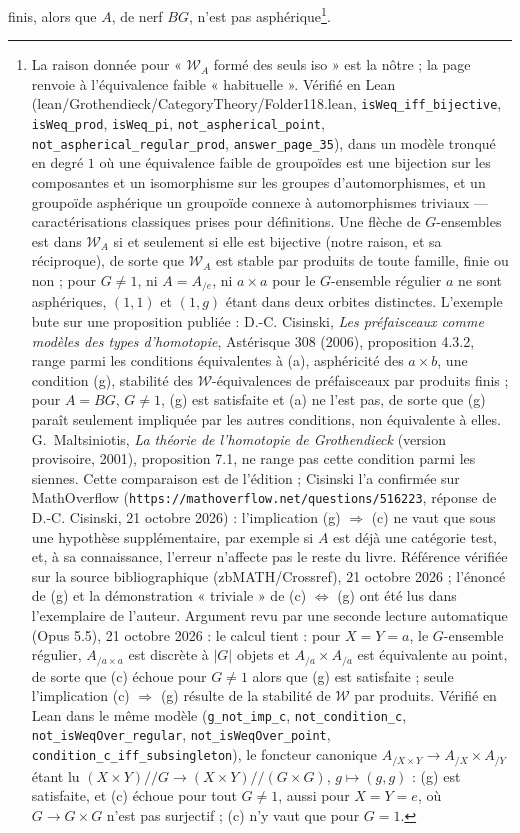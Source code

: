\documentclass[11pt,a4paper]{article}
\begin{document}
finis, alors que $A$, de nerf $BG$, n'est pas asphérique\footnote{La raison
donnée pour « $\mathcal{W}_{A}$ formé des seuls iso » est la nôtre ; la page
renvoie à l'équivalence faible « habituelle ». Vérifié en Lean
(lean/Grothendieck/CategoryTheory/Folder118.lean, \texttt{isWeq\_iff\_bijective},
\texttt{isWeq\_prod}, \texttt{isWeq\_pi}, \texttt{not\_aspherical\_point},
\texttt{not\_aspherical\_regular\_prod}, \texttt{answer\_page\_35}), dans un
modèle tronqué en degré $1$ où une équivalence faible de groupoïdes est une
bijection sur les composantes et un isomorphisme sur les groupes
d'automorphismes, et un groupoïde asphérique un groupoïde connexe à
automorphismes triviaux --- caractérisations classiques prises pour
définitions. Une flèche de $G$-ensembles est dans $\mathcal{W}_{A}$ si et
seulement si elle est bijective (notre raison, et sa réciproque), de sorte que
$\mathcal{W}_{A}$ est stable par produits de toute famille, finie ou non ; pour
$G \neq 1$, ni $A = A_{/e}$, ni $a \times a$ pour le $G$-ensemble régulier $a$
ne sont asphériques, $(1, 1)$ et $(1, g)$ étant dans deux orbites distinctes.
L'exemple bute sur une proposition publiée : D.-C. Cisinski, \emph{Les
préfaisceaux comme modèles des types d'homotopie}, Astérisque 308 (2006),
proposition 4.3.2, range parmi les conditions équivalentes à (a), asphéricité
des $a \times b$, une condition (g), stabilité des $\mathcal{W}$-équivalences
de préfaisceaux par produits finis ; pour $A = BG$, $G \neq 1$, (g) est
satisfaite et (a) ne l'est pas, de sorte que (g) paraît seulement
impliquée par les autres conditions, non équivalente à elles. G.~Maltsiniotis, \emph{La théorie de l'homotopie de
Grothendieck} (version provisoire, 2001), proposition 7.1, ne range pas cette
condition parmi les siennes. Cette comparaison est de l'édition ; Cisinski l'a confirmée sur MathOverflow (\texttt{https://mathoverflow.net/questions/516223}, réponse de D.-C. Cisinski, 21 octobre 2026) : l'implication (g) $\Rightarrow$ (c) ne vaut que sous une hypothèse supplémentaire, par exemple si $A$ est déjà une catégorie test, et, à sa connaissance, l'erreur n'affecte pas le reste du livre. Référence vérifiée sur la source bibliographique (zbMATH/Crossref), 21 octobre 2026 ; l'énoncé de (g) et la démonstration « triviale » de (c) $\Leftrightarrow$ (g) ont été lus dans l'exemplaire de l'auteur. Argument revu par une seconde lecture automatique (Opus 5.5), 21 octobre 2026 : le calcul tient : pour $X = Y = a$, le $G$-ensemble régulier, $A_{/a \times a}$ est discrète à $|G|$ objets et $A_{/a} \times A_{/a}$ est équivalente au point, de sorte que (c) échoue pour $G \neq 1$ alors que (g) est satisfaite ; seule l'implication (c) $\Rightarrow$ (g) résulte de la stabilité de $\mathcal{W}$ par produits. Vérifié en Lean dans le même modèle (\texttt{g\_not\_imp\_c}, \texttt{not\_condition\_c}, \texttt{not\_isWeqOver\_regular}, \texttt{not\_isWeqOver\_point}, \texttt{condition\_c\_iff\_subsingleton}), le foncteur canonique $A_{/X \times Y} \to A_{/X} \times A_{/Y}$ étant lu $(X \times Y)/\!/G \to (X \times Y)/\!/(G \times G)$, $g \mapsto (g, g)$ : (g) est satisfaite, et (c) échoue pour tout $G \neq 1$, aussi pour $X = Y = e$, où $G \to G \times G$ n'est pas surjectif ; (c) n'y vaut que pour $G = 1$.}.
\end{document}
